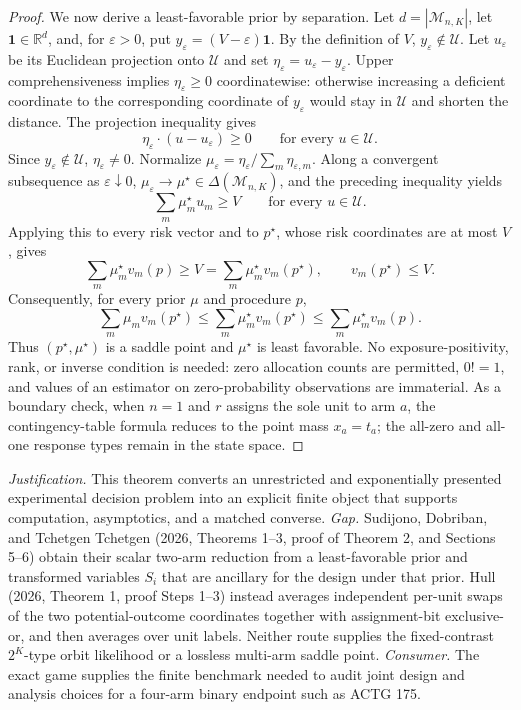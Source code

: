 \documentclass{article}
\begin{document}
\begin{proof}
We now derive a least-favorable prior by separation.  Let \(d=|\mathcal M_{n,K}|\), let \(\mathbf 1\in\mathbb R^d\), and, for \(\varepsilon>0\), put \(y_\varepsilon=(V-\varepsilon)\mathbf 1\).  By the definition of \(V\), \(y_\varepsilon\notin\mathcal U\).  Let \(u_\varepsilon\) be its Euclidean projection onto \(\mathcal U\) and set \(\eta_\varepsilon=u_\varepsilon-y_\varepsilon\).  Upper comprehensiveness implies \(\eta_\varepsilon\ge0\) coordinatewise: otherwise increasing a deficient coordinate to the corresponding coordinate of \(y_\varepsilon\) would stay in \(\mathcal U\) and shorten the distance.  The projection inequality gives
\[
 \eta_\varepsilon\mathbin{\cdot}(u-u_\varepsilon)\ge0
 \qquad\text{for every }u\in\mathcal U.
\]
Since \(y_\varepsilon\notin\mathcal U\), \(\eta_\varepsilon\ne0\).  Normalize
\(\mu_\varepsilon=\eta_\varepsilon/\sum_m\eta_{\varepsilon,m}\).  Along a convergent subsequence as \(\varepsilon\downarrow0\), \(\mu_\varepsilon\to\mu^\star\in\Delta(\mathcal M_{n,K})\), and the preceding inequality yields
\[
 \sum_m\mu_m^\star u_m\ge V
 \qquad\text{for every }u\in\mathcal U.
\]
Applying this to every risk vector and to \(p^\star\), whose risk coordinates are at most \(V\), gives
\[
 \sum_m\mu_m^\star v_m(p)\ge V
 =\sum_m\mu_m^\star v_m(p^\star),
 \qquad v_m(p^\star)\le V.
\]
Consequently, for every prior \(\mu\) and procedure \(p\),
\[
 \sum_m\mu_m v_m(p^\star)
 \le\sum_m\mu_m^\star v_m(p^\star)
 \le\sum_m\mu_m^\star v_m(p).
\]
Thus \((p^\star,\mu^\star)\) is a saddle point and \(\mu^\star\) is least favorable.  No exposure-positivity, rank, or inverse condition is needed: zero allocation counts are permitted, \(0!=1\), and values of an estimator on zero-probability observations are immaterial.  As a boundary check, when \(n=1\) and \(r\) assigns the sole unit to arm \(a\), the contingency-table formula reduces to the point mass \(x_a=t_a\); the all-zero and all-one response types remain in the state space.
\end{proof}
\par\smallskip\noindent \textit{Justification.} This theorem converts an unrestricted and exponentially presented experimental decision problem into an explicit finite object that supports computation, asymptotics, and a matched converse. \textit{Gap.} Sudijono, Dobriban, and Tchetgen Tchetgen (2026, Theorems 1--3, proof of Theorem 2, and Sections 5--6) obtain their scalar two-arm reduction from a least-favorable prior and transformed variables \(S_i\) that are ancillary for the design under that prior. Hull (2026, Theorem 1, proof Steps 1--3) instead averages independent per-unit swaps of the two potential-outcome coordinates together with assignment-bit exclusive-or, and then averages over unit labels. Neither route supplies the fixed-contrast \(2^K\)-type orbit likelihood or a lossless multi-arm saddle point. \textit{Consumer.} The exact game supplies the finite benchmark needed to audit joint design and analysis choices for a four-arm binary endpoint such as ACTG 175.
\end{document}
